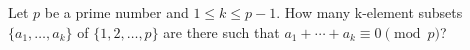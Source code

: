 Let $p$ be a prime number and $1 \le k \le p - 1$.
How many k-element subsets $\{a_1, \dots, a_k \}$ of $\{1, 2, \dots, p\}$ are there such that $a_1 + \cdots + a_k \equiv 0 \pmod{p}$?
